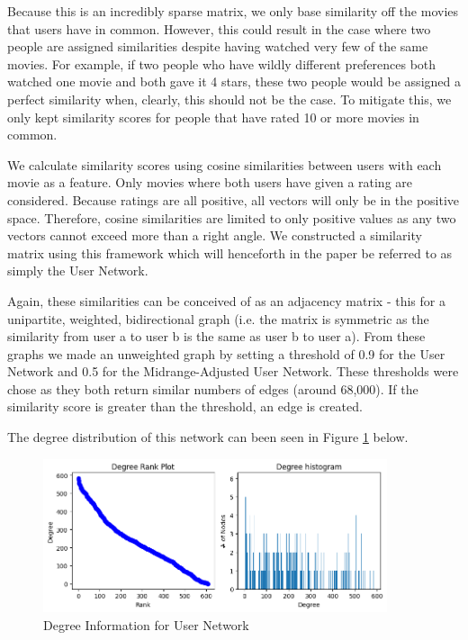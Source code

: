 \documentclass[12pt]{article}
\numberwithin{equation}{section}
\begin{document}
Because this is an incredibly sparse matrix, we only base similarity off the movies that users have in common. However, this could result in the case where two people are assigned similarities despite having watched very few of the same movies. For example, if two people who have wildly different preferences both watched one movie and both gave it 4 stars, these two people would be assigned a perfect similarity when, clearly, this should not be the case. To mitigate this, we only kept similarity scores for people that have rated 10 or more movies in common.

We calculate similarity scores using cosine similarities between users with each movie as a feature. Only movies where both users have given a rating are considered. Because ratings are all positive, all vectors will only be in the positive space. Therefore, cosine similarities are limited to only positive values as any two vectors cannot exceed more than a right angle. We constructed a similarity matrix using this framework which will henceforth in the paper be referred to as simply the User Network.

Again, these similarities can be conceived of as an adjacency matrix - this for a unipartite, weighted, bidirectional graph (i.e. the matrix is symmetric as the similarity from user a to user b is the same as user b to user a). From these graphs we made an unweighted graph by setting a threshold of 0.9 for the User Network and 0.5 for the Midrange-Adjusted User Network. These thresholds were chose as they both return similar numbers of edges (around 68,000). If the similarity score is greater than the threshold, an edge is created.

The degree distribution of this network can been seen in Figure \ref{fig:UN_degreeinfo} below.

\begin{figure}[h!]
    \begin{minipage}[b]{01\linewidth}
         \centering
  	\includegraphics[width=0.9\textwidth]{UN_degreeinfo.png}
  	\caption{Degree Information for User Network}
  	\label{fig:UN_degreeinfo}
    \end{minipage}
\end{figure}
\end{document}
